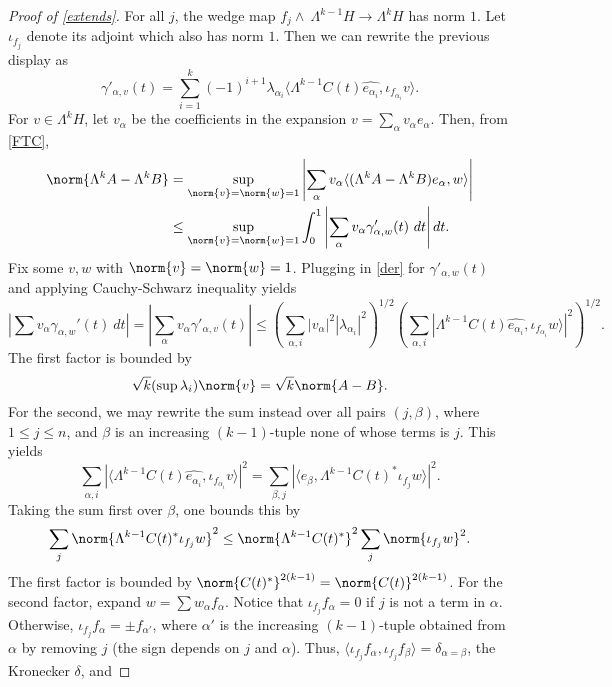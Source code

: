 \documentclass[12pt]{amsart}
\begin{document}
\begin{proof}[Proof of \cref{extends}]
For all $j$, the wedge map $f_j\wedge\:\Lambda^{k-1}H \to \Lambda^k H$ has norm $1$. Let $\iota_{f_j}$ denote its adjoint which also has norm $1$. Then we can rewrite the previous display as
\begin{equation}\label{der}\gamma'_{\alpha,v}(t) = \sum_{i=1}^k(-1)^{i+1}\lambda_{\alpha_i}\langle \Lambda^{k-1}C(t)\widehat{e_{\alpha_i}},\iota_{f_{\alpha_i}}v\rangle.\end{equation}
For $v \in \Lambda^k H$, let $v_\alpha$ be the coefficients in the expansion $v = \sum_{\alpha} v_\alpha e_\alpha$. Then, from \eqref{FTC},
\begin{align}
\label{ff}
\begin{split}
\norm{\Lambda^k A - \Lambda^k B} &= \sup_{\norm{v} = \norm{w} = 1}\left|\sum_\alpha v_\alpha\langle (\Lambda^k A-\Lambda^kB)e_\alpha,w\rangle\right|\\
&\leq \sup_{\norm{v} = \norm{w} = 1} \int_0^1 \left|\sum_\alpha v_\alpha\gamma_{\alpha,w}'(t)\ dt\right| dt.
\end{split}\end{align}
Fix some $v,w$ with $\norm{v} = \norm{w} = 1$. Plugging in \eqref{der} for $\gamma'_{\alpha,w}(t)$ and applying Cauchy-Schwarz inequality yields
\begin{equation}\label{CS}\left|\sum v_\alpha\gamma_{\alpha,w}'(t)\ dt\right| = \left|\sum_{\alpha} v_\alpha\gamma'_{\alpha,v}(t)\right| \leq \left(\sum_{\alpha,i}|v_\alpha|^2|\lambda_{\alpha_i}|^2\right)^{1/2}\left(\sum_{\alpha,i}| \Lambda^{k-1}C(t)\widehat{e_{\alpha_i}},\iota_{f_{\alpha_i}}w\rangle|^2\right)^{1/2}.\end{equation}
The first factor is bounded by \[\sqrt{k}(\sup \lambda_i)\norm{v} = \sqrt{k}\norm{A-B}.\]
For the second, we may rewrite the sum instead over all pairs $(j,\beta)$, where $1 \leq j \leq n$, and $\beta$ is an increasing $(k-1)$-tuple none of whose terms is $j$. This yields
\[\sum_{\alpha,i}|\langle \Lambda^{k-1}C(t)\widehat{e_{\alpha_i}},\iota_{f_{\alpha_i}}v\rangle|^2 = \sum_{\beta,j}|\langle e_{\beta}, \Lambda^{k-1}C(t)^{\ast}\iota_{f_{j}}w\rangle|^2.\] Taking the sum first over $\beta$, one bounds this by
\[\sum_j \norm{\Lambda^{k-1}C(t)^\ast\iota_{f_j}w}^2 \leq \norm{\Lambda^{k-1}C(t)^\ast}^2\sum_j \norm{\iota_{f_j}w}^2.\]
The first factor is bounded by $\norm{C(t)^\ast}^{2(k-1)} = \norm{C(t)}^{2(k-1)}$. For the second factor, expand $w = \sum w_\alpha f_\alpha$.
Notice that $\iota_{f_j}f_{\alpha} = 0$ if $j$ is not a term in $\alpha$. Otherwise, $\iota_{f_j}f_\alpha = \pm f_{\alpha'}$, where $\alpha'$ is the increasing $(k-1)$-tuple obtained from $\alpha$ by removing $j$ (the sign depends on $j$ and $\alpha$). Thus, $\langle \iota_{f_j}f_\alpha,\iota_{f_j}f_\beta\rangle = \delta_{\alpha  = \beta}$, the Kronecker $\delta$, and

\end{proof}
\end{document}
